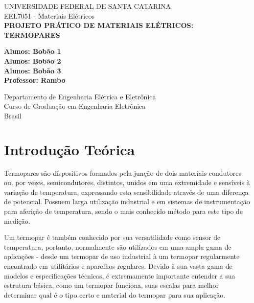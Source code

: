 \documentclass[a4paper,12pt]{report}
\begin{document}
	
	\begin{titlepage}
		\begin{center}
			
			\Large
			UNIVERSIDADE FEDERAL DE SANTA CATARINA\\
			EEL7051 - Materiais Elétricos\\
			\vspace*{5cm}
			\Huge
			\textbf{PROJETO PRÁTICO DE MATERIAIS ELÉTRICOS:}\\
			\textbf{TERMOPARES}
			
			\vspace{1.5cm}
			
			\vfill
			\Large
			\textbf{Alunos: Bobão 1}\\
			\textbf{Alunos: Bobão 2}\\
			\textbf{Alunos: Bobão 3}\\
			
			\textbf{Professor: Rambo} %
			\vspace{0.8cm}
			
			Departamento de Engenharia Elétrica e Eletrônica\\
			Curso de Graduação em Engenharia Eletrônica\\
			Brasil\\
			
			
			
		\end{center}
	\end{titlepage}
	\Large
	
	\tableofcontents
	
	
	\pagebreak
	\listoffigures
	\pagebreak
	\tableofcontents
	\pagebreak
	
	\chapter{Introdução Teórica}
	
	Termopares são dispositivos formados pela junção de dois materiais condutores ou, por vezes, semicondutores, distintos, unidos em uma extremidade e sensíveis à variação de temperatura, expressando esta sensibilidade através de uma diferença de potencial. Possuem larga utilização industrial e em sistemas de instrumentação para aferição de temperatura, sendo o mais conhecido método para este tipo de medição.
	
	\noindent Um termopar é também conhecido por sua versatilidade como sensor de temperatura, portanto, normalmente são utilizados em uma ampla gama de aplicações - desde um termopar de uso industrial à um termopar regularmente encontrado em utilitários e aparelhos regulares. Devido à sua vasta gama de modelos e especificações técnicas, é extremamente importante entender a sua estrutura básica, como um termopar funciona, suas escalas para melhor determinar qual é o tipo certo e material do termopar para sua aplicação.
	
\end{document}
